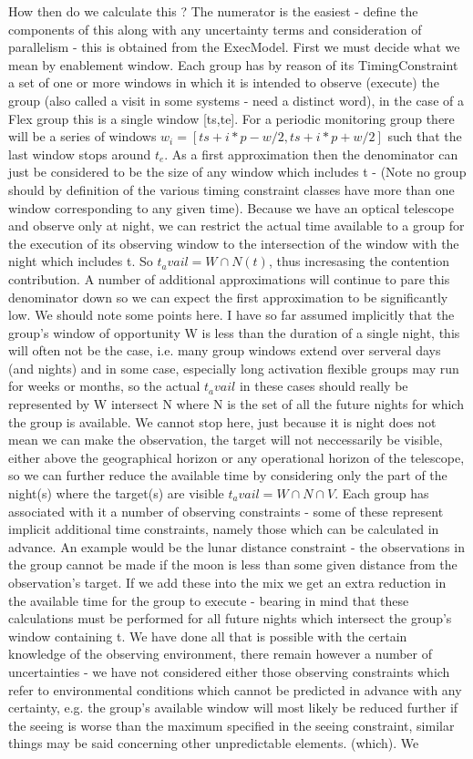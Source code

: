 How then do we calculate this ? The numerator is the easiest - define the components of this along with any uncertainty terms and consideration of parallelism - this is obtained from the ExecModel. First we must decide what we mean by enablement window. Each group has by reason of its TimingConstraint a set of one or more windows in which it is intended to observe (execute) the group (also called a visit in some systems - need a distinct word), in the case of a Flex group this is a single window [ts,te]. For a periodic monitoring group there will be a series of windows $w_i = [ts+i*p-w/2, ts+i*p+w/2]$ such that the last window stops around $t_e$. As a first approximation then the denominator can just be considered to be the size of any window which includes t - (Note no group should by definition of the various timing constraint classes have more than one window corresponding to any given time). Because we have an optical telescope and observe only at night, we can restrict the actual time available to a group for the execution of its observing window to the intersection of the window with the night which includes t. So $t_avail = W \cap N(t)$, thus incresasing the contention contribution. A number of additional approximations will continue to pare this denominator down so we can expect the first approximation to be significantly low. We should note some points here. I have so far assumed implicitly that the group's window of opportunity W is less than the duration of a single night, this will often not be the case, i.e. many group windows extend over serveral days (and nights) and in some case, especially long activation flexible groups may run for weeks or months, so the actual $t_avail$ in these cases should really be represented by W intersect {N} where N is the set of all the future nights for which the group is available. We cannot stop here, just because it is night does not mean we can make the observation, the target will not neccessarily be visible, either above the geographical horizon or any operational horizon of the telescope, so we can further reduce the available time by considering only the part of the night(s) where the target(s) are visible $t_avail = W \cap N \cap V$. Each group has associated with it a number of observing constraints - some of these represent implicit additional time constraints, namely those which can be calculated in advance. An example would be the lunar distance constraint - the observations in the group cannot be made if the moon is less than some given distance from the observation's target. If we add these into the mix we get an extra reduction in the available time for the group to execute - bearing in mind that these calculations must be performed for all future nights which intersect the group's window containing t. We have done all that is possible with the certain knowledge of the observing environment, there remain however a number of uncertainties - we have not considered either those observing constraints which refer to environmental conditions which cannot be predicted in advance with any certainty, e.g. the group's available window will most likely be reduced further if the seeing is worse than the maximum specified in the seeing constraint, similar things may be said concerning other unpredictable elements. (which). We 